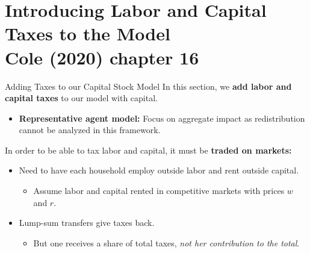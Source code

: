 \documentclass[10pt,c,aspectratio=1610,handout]{beamer}
\begin{document}
\section{Introducing Labor and Capital Taxes to the Model\\{\small Cole (2020) chapter 16}}%
\begin{frame}{Adding Taxes to our Capital Stock Model}%
  In this section, we \textbf{add labor and capital taxes} to our model with capital.%
  \begin{itemize}%
    \item[$\blacktriangleright$] \textbf{Representative agent model:} Focus on aggregate impact as redistribution cannot be analyzed in this framework.%
  \end{itemize}%
  \vspace*{0.2in}%
  \pause%
  In order to be able to tax labor and capital, it must be \textbf{traded on markets:}%
  \begin{itemize}%
    \item[$\blacktriangleright$] Need to have each household employ outside labor and rent outside capital.%
    \begin{itemize}
      \item[$\rightarrow$] Assume labor and capital rented in competitive markets with prices $w$ and $r$.%
    \end{itemize}
    \vspace*{0.1in}%
    \pause%
    \item[$\blacktriangleright$] Lump-sum transfers give taxes back.%
    \begin{itemize}%
      \item[$\rightarrow$] But one receives a share of total taxes, \textit{not her contribution to the total}.%
    \end{itemize}%
  \end{itemize}%
\end{frame}%
\end{document}
